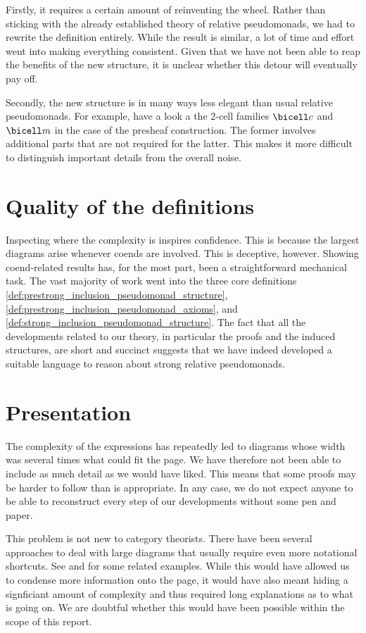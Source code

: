 Firstly, it requires a certain amount of reinventing the wheel. Rather than
sticking with the already established theory of relative pseudomonads, we had to
rewrite the definition entirely. While the result is similar, a lot of time and
effort went into making everything consistent. Given that we have not been able to
reap the benefits of the new structure, it is unclear whether this detour will
eventually pay off.

Secondly, the new structure is in many ways less elegant than usual relative
pseudomonads. For example, have a look a the 2-cell families $\bicell c$ and
$\bicell m$ in the case of the presheaf construction. The former involves
additional parts that are not required for the latter. This makes it more
difficult to distinguish important details from the overall noise.

\section{Quality of the definitions}

Inspecting where the complexity is inspires confidence. This is because
the largest diagrams arise whenever coends are involved. This is deceptive,
however. Showing coend-related results has, for the most part, been a
straightforward mechanical task. The vast majority of work went into the three
core definitions \ref{def:prestrong_inclusion_pseudomonad_structure},
\ref{def:prestrong_inclusion_pseudomonad_axioms}, and
\ref{def:strong_inclusion_pseudomonad_structure}. The fact that all the
developments related to our theory, in particular the proofs and the induced
structures, are short and succinct suggests that we have indeed developed a
suitable language to reason about strong relative pseudomonads.

\section{Presentation}

The complexity of the expressions has repeatedly led to diagrams whose width was
several times what could fit the page. We have therefore not been able to
include as much detail as we would have liked. This means that some proofs may
be harder to follow than is appropriate. In any case, we do not expect anyone to
be able to reconstruct every step of our developments without some pen and
paper.

This problem is not new to category theorists. There have been several
approaches to deal with large diagrams that usually require even more notational
shortcuts. See \cite{marmolejo2013} and \cite{saville2023} for some related
examples. While this would have allowed us to condense more information onto the
page, it would have also meant hiding a signficiant amount of complexity and
thus required long explanations as to what is going on. We are doubtful whether
this would have been possible within the scope of this report.


